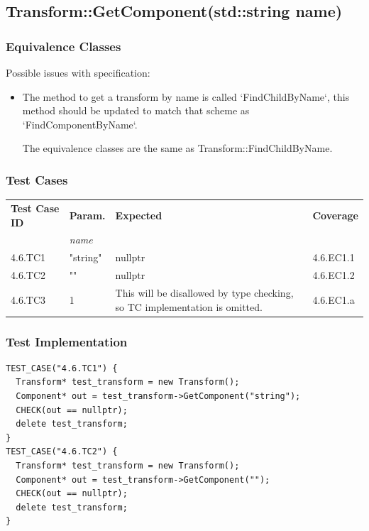 \documentclass[11pt]{article}
\begin{document}
\clearpage
\subsection{Transform::GetComponent(std::string name)}
\label{sec:org3972870}

\subsubsection*{Equivalence Classes}
\label{sec:org3417ca0}
Possible issues with specification:
\begin{itemize}
\item The method to get a transform by name is called `FindChildByName`, this method should be updated to match that scheme as `FindComponentByName`.

The equivalence classes are the same as Transform::FindChildByName.
\end{itemize}
\subsubsection*{Test Cases}
\label{sec:org113a98e}

\begin{center}
\begin{tabularx}{\textwidth}{lXXX}
\hline
\textbf{Test Case ID} & \textbf{Param.} & \textbf{Expected} & \textbf{Coverage}\\
 & \textit{name} &  & \\
\hline
4.6.TC1 & "string" & nullptr & 4.6.EC1.1\\
\hline
4.6.TC2 & "" & nullptr & 4.6.EC1.2\\
\hline
4.6.TC3 & 1 & This will be disallowed by type checking, so TC implementation is omitted. & 4.6.EC1.a\\
\hline
\end{tabularx}
\end{center}
\subsubsection*{Test Implementation}
\label{sec:orga7ea597}

\begin{verbatim}
TEST_CASE("4.6.TC1") {
  Transform* test_transform = new Transform();
  Component* out = test_transform->GetComponent("string");
  CHECK(out == nullptr);
  delete test_transform;
}
TEST_CASE("4.6.TC2") {
  Transform* test_transform = new Transform();
  Component* out = test_transform->GetComponent("");
  CHECK(out == nullptr);
  delete test_transform;
}
\end{verbatim}
\end{document}
